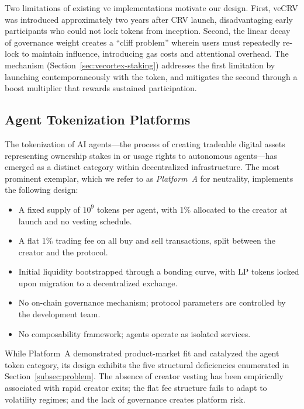 Two limitations of existing ve implementations motivate our design. First,
veCRV was introduced approximately two years after CRV launch, disadvantaging
early participants who could not lock tokens from inception. Second, the linear
decay of governance weight creates a ``cliff problem'' wherein users must
repeatedly re-lock to maintain influence, introducing gas costs and
attentional overhead. The \veCORTEX{} mechanism
(Section~\ref{sec:vecortex-staking}) addresses the first limitation by
launching contemporaneously with the token, and mitigates the second through a
boost multiplier that rewards sustained participation.

\subsection{Agent Tokenization Platforms}
\label{subsec:rw-agent}

The tokenization of AI agents---the process of creating tradeable digital
assets representing ownership stakes in or usage rights to autonomous
agents---has emerged as a distinct category within decentralized infrastructure.
The most prominent exemplar, which we refer to as \emph{Platform~A} for
neutrality, implements the following design:

\begin{itemize}
  \item A fixed supply of $10^9$ tokens per agent, with 1\% allocated to the
    creator at launch and no vesting schedule.
  \item A flat 1\% trading fee on all buy and sell transactions, split between
    the creator and the protocol.
  \item Initial liquidity bootstrapped through a bonding curve, with LP tokens
    locked upon migration to a decentralized exchange.
  \item No on-chain governance mechanism; protocol parameters are controlled by
    the development team.
  \item No composability framework; agents operate as isolated services.
\end{itemize}

While Platform~A demonstrated product-market fit and catalyzed the agent token
category, its design exhibits the five structural deficiencies enumerated in
Section~\ref{subsec:problem}. The absence of creator vesting has been
empirically associated with rapid creator exits; the flat fee structure fails
to adapt to volatility regimes; and the lack of governance creates platform
risk.

